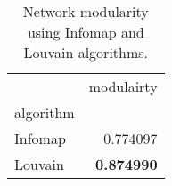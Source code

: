 \begin{table}[!htbp]
\centering
\caption{Network modularity using Infomap and Louvain algorithms.}
\label{tab:modularity}
\begin{tabular}{lr}
\toprule
 & modulairty \\
algorithm &  \\
\midrule
Infomap & 0.774097 \\
Louvain & \textbf{0.874990} \\
\bottomrule
\end{tabular}
\end{table}

